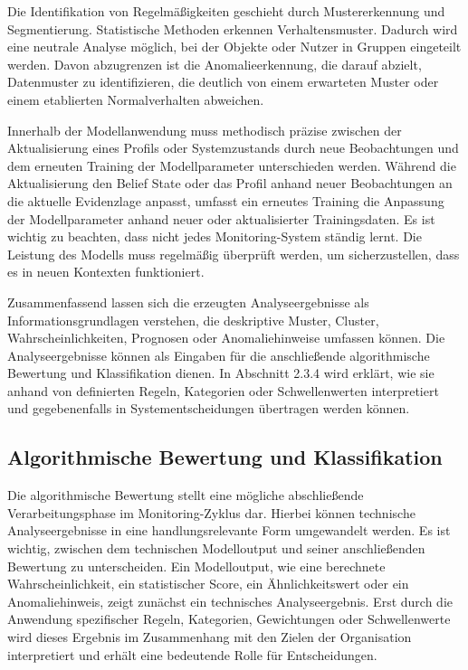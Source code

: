 Die Identifikation von Regelmäßigkeiten geschieht durch Mustererkennung und Segmentierung. Statistische Methoden erkennen Verhaltensmuster. Dadurch wird eine neutrale Analyse möglich, bei der Objekte oder Nutzer in Gruppen eingeteilt werden. Davon abzugrenzen ist die Anomalieerkennung, die darauf abzielt, Datenmuster zu identifizieren, die deutlich von einem erwarteten Muster oder einem etablierten Normalverhalten abweichen.

Innerhalb der Modellanwendung muss methodisch präzise zwischen der Aktualisierung eines Profils oder Systemzustands durch neue Beobachtungen und dem erneuten Training der Modellparameter unterschieden werden. Während die Aktualisierung den Belief State oder das Profil anhand neuer Beobachtungen an die aktuelle Evidenzlage anpasst, umfasst ein erneutes Training die Anpassung der Modellparameter anhand neuer oder aktualisierter Trainingsdaten. Es ist wichtig zu beachten, dass nicht jedes Monitoring-System ständig lernt. Die Leistung des Modells muss regelmäßig überprüft werden, um sicherzustellen, dass es in neuen Kontexten funktioniert.

Zusammenfassend lassen sich die erzeugten Analyseergebnisse als Informationsgrundlagen verstehen, die deskriptive Muster, Cluster, Wahrscheinlichkeiten, Prognosen oder Anomaliehinweise umfassen können. Die Analyseergebnisse können als Eingaben für die anschließende algorithmische Bewertung und Klassifikation dienen. In Abschnitt 2.3.4 wird erklärt, wie sie anhand von definierten Regeln, Kategorien oder Schwellenwerten interpretiert und gegebenenfalls in Systementscheidungen übertragen werden können.

\subsection{Algorithmische Bewertung und Klassifikation}

Die algorithmische Bewertung stellt eine mögliche abschließende Verarbeitungsphase im Monitoring-Zyklus dar. Hierbei können technische Analyseergebnisse in eine handlungsrelevante Form umgewandelt werden. Es ist wichtig, zwischen dem technischen Modelloutput und seiner anschließenden Bewertung zu unterscheiden. Ein Modelloutput, wie eine berechnete Wahrscheinlichkeit, ein statistischer Score, ein Ähnlichkeitswert oder ein Anomaliehinweis, zeigt zunächst ein technisches Analyseergebnis. Erst durch die Anwendung spezifischer Regeln, Kategorien, Gewichtungen oder Schwellenwerte wird dieses Ergebnis im Zusammenhang mit den Zielen der Organisation interpretiert und erhält eine bedeutende Rolle für Entscheidungen.


